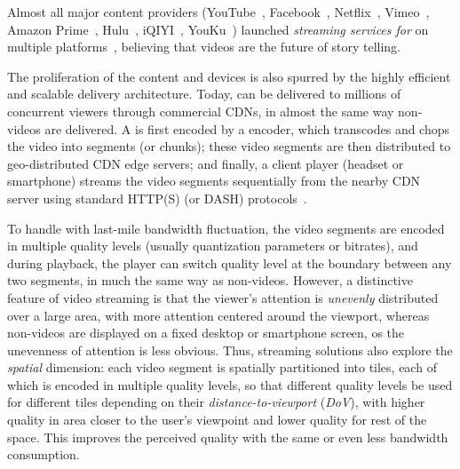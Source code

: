 Almost all major content providers (YouTube~\cite{??}, Facebook~\cite{??}, Netflix~\cite{??}, Vimeo~\cite{??}, Amazon Prime~\cite{??}, Hulu~\cite{??}, iQIYI~\cite{??}, YouKu~\cite{??}) launched {\em streaming services for \vrvideos} on multiple  platforms~\cite{oculus,samsung,daydreams,etc}, believing that \vr videos are the future of story telling. 

The proliferation of the \vrvideo content and devices is also spurred by the highly efficient and scalable delivery architecture. 
Today, \vrvideos can be delivered to millions of concurrent viewers through commercial CDNs, in almost the same way non-\vr videos are delivered.
A \vrvideo is first encoded by a \vr encoder, which transcodes and chops the video into segments (or chunks); these video segments are then distributed to geo-distributed CDN edge servers; and finally, a client player (headset or smartphone) streams the video segments sequentially from the nearby CDN server using standard HTTP(S) (or DASH) protocols~\cite{hls,https://www.wowza.com/solutions/streaming-types/virtual-reality-and-360-degree-streaming}.

To handle with last-mile bandwidth fluctuation, the video segments are encoded in multiple quality levels (usually quantization parameters or bitrates), and during playback, the \vrvideo player can switch quality level at the boundary between any two segments, in much the same way as non-\vr videos.
However, a distinctive feature of \vr video streaming is that the viewer's attention is {\em unevenly} distributed over a large area, with more attention centered around the viewport, whereas non-\vr videos are displayed on a fixed desktop or smartphone screen, os the unevenness of attention is less obvious.
Thus, \vrvideo streaming solutions also explore the {\em spatial} dimension: each video segment is spatially partitioned into tiles, each of which is encoded in multiple quality levels, so that different quality levels be used for different tiles depending on their {\em distance-to-viewport} ({\em DoV}), with higher quality in area closer to the user's viewpoint and lower quality for rest of the space.
This improves the perceived quality with the same or even less bandwidth consumption. 

